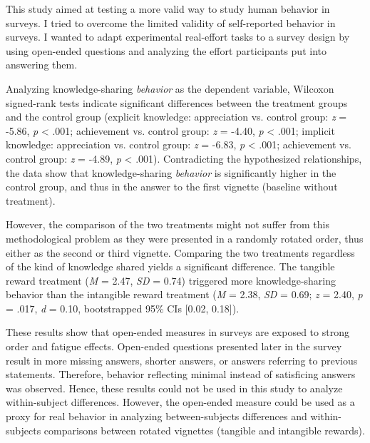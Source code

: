 \documentclass[twocolumn, issue, empirical, authordate]{jote-new-article}
\begin{document}
\begin{originalPurpose}

This study aimed at testing a more valid way to study human behavior in surveys. I tried to overcome the limited validity of self-reported behavior in surveys. I wanted to adapt experimental real-effort tasks to a survey design by using open-ended questions and analyzing the effort participants put into answering them.

\end{originalPurpose}
Analyzing knowledge-sharing \emph{behavior} as the dependent variable, Wilcoxon signed-rank tests indicate significant differences between the treatment groups and the control group (explicit knowledge: appreciation vs. control group: \emph{z} = -5.86, \emph{p} \textless{} .001; achievement vs. control group: \emph{z} = -4.40, \emph{p} \textless{} .001; implicit knowledge: appreciation vs. control group: \emph{z} = -6.83, \emph{p} \textless{} .001; achievement vs. control group: \emph{z} = -4.89, \emph{p} \textless{} .001). Contradicting the hypothesized relationships, the data show that knowledge-sharing \emph{behavior} is significantly higher in the control group, and thus in the answer to the first vignette (baseline without treatment).

However, the comparison of the two treatments might not suffer from this methodological problem as they were presented in a randomly rotated order, thus either as the second or third vignette. Comparing the two treatments regardless of the kind of knowledge shared yields a significant difference. The tangible reward treatment (\emph{M} = 2.47, \emph{SD} = 0.74) triggered more knowledge-sharing behavior than the intangible reward treatment (\emph{M} = 2.38, \emph{SD} = 0.69; \emph{z} = 2.40, \emph{p} = .017, \emph{d} = 0.10, bootstrapped 95\% CIs {[}0.02, 0.18{]}).

These results show that open-ended measures in surveys are exposed to strong order and fatigue effects. Open-ended questions presented later in the survey result in more missing answers, shorter answers, or answers referring to previous statements. Therefore, behavior reflecting minimal instead of satisficing answers was observed. Hence, these results could not be used in this study to analyze within-subject differences. However, the open-ended measure could be used as a proxy for real behavior in analyzing between-subjects differences and within-subjects comparisons between rotated vignettes (tangible and intangible rewards).
\end{document}
